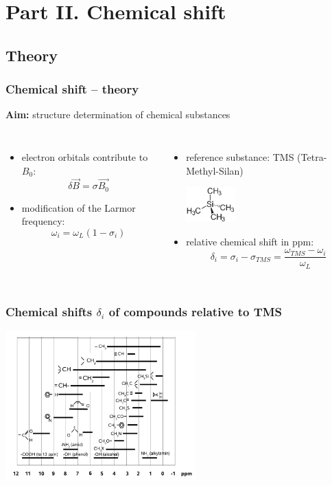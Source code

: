 \documentclass[aspectratio=169]{beamer}
\begin{document}
\section{Part II. Chemical shift}

\subsection{Theory}

\begin{frame}
\frametitle{Chemical shift -- theory}
\begin{center}
	\textbf{Aim:} structure determination of chemical substances
\end{center}
\pause
\begin{columns}
	\begin{itemize}
		\item electron orbitals contribute to $B_0$:
		\[\delta \vec{B} = \sigma \vec{B_0} \]
		\item modification of the Larmor frequency:
		\[ \omega_i = \omega_L \left(1-\sigma_i \right) \]
	\end{itemize}
	
	\pause
	\begin{itemize}
		\item reference substance: TMS (Tetra-Methyl-Silan) 
		
		\includegraphics[width = 0.3\textwidth]{./Resources/Tetramethylsilan.png}
		\item relative chemical shift in ppm:
		\[ \delta_i = \sigma_i -\sigma_{TMS} = \frac{\omega_{TMS} - \omega_i}{\omega_L} \]
	\end{itemize}
\end{columns}
\end{frame}

\begin{frame}
\frametitle{Chemical shifts $\delta_i$ of compounds relative to TMS}

\begin{center}
\includegraphics[width= 0.55\textwidth]{./Resources/chem_shifts.png}
\end{center}
\end{frame}
\end{document}

